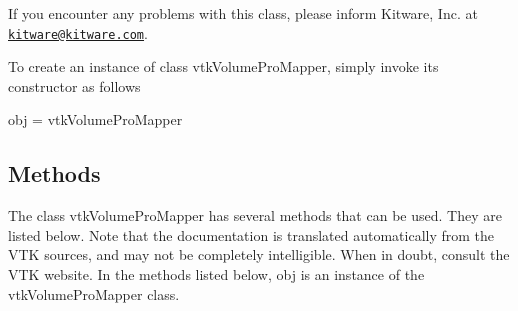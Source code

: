 If you encounter any problems with this class, please inform Kitware, Inc. at \href{mailto:kitware@kitware.com}{\tt kitware@kitware.\-com}.

To create an instance of class vtk\-Volume\-Pro\-Mapper, simply invoke its constructor as follows \begin{DoxyVerb}  obj = vtkVolumeProMapper
\end{DoxyVerb}
 \hypertarget{vtkwidgets_vtkxyplotwidget_Methods}{}\subsection{Methods}\label{vtkwidgets_vtkxyplotwidget_Methods}
The class vtk\-Volume\-Pro\-Mapper has several methods that can be used. They are listed below. Note that the documentation is translated automatically from the V\-T\-K sources, and may not be completely intelligible. When in doubt, consult the V\-T\-K website. In the methods listed below, {\ttfamily obj} is an instance of the vtk\-Volume\-Pro\-Mapper class. 
